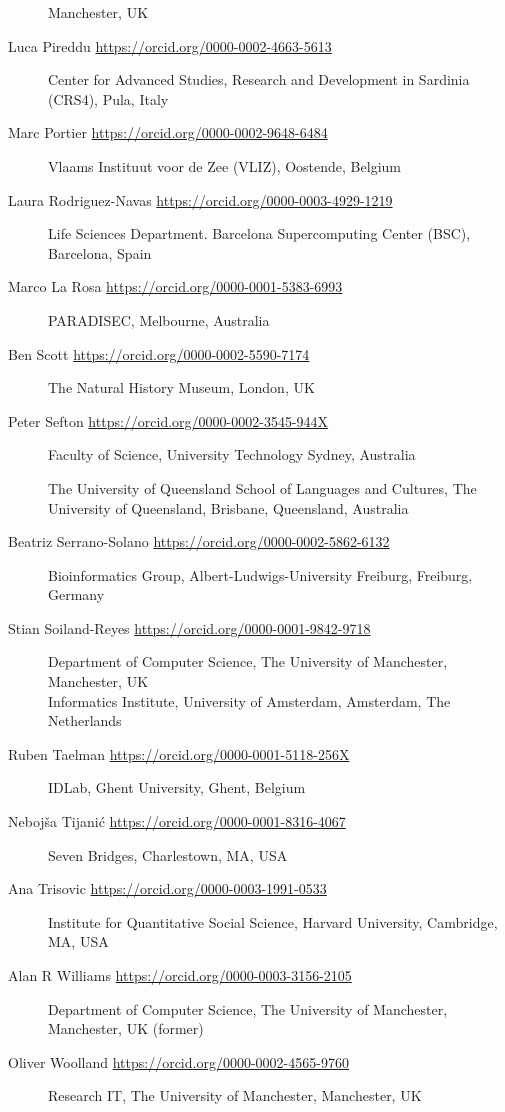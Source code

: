 \begin{description}
Manchester, UK
\item[Luca Pireddu \url{https://orcid.org/0000-0002-4663-5613}]
Center for Advanced Studies, Research and Development in Sardinia
(CRS4), Pula, Italy
\item[Marc Portier \url{https://orcid.org/0000-0002-9648-6484}]
Vlaams Instituut voor de Zee (VLIZ), Oostende, Belgium
\item[Laura Rodriguez-Navas \url{https://orcid.org/0000-0003-4929-1219}]
Life Sciences Department. Barcelona Supercomputing Center (BSC),
Barcelona, Spain
\item[Marco La Rosa \url{https://orcid.org/0000-0001-5383-6993}]
PARADISEC, Melbourne, Australia
\item[Ben Scott \url{https://orcid.org/0000-0002-5590-7174}]
The Natural History Museum, London, UK
\item[Peter Sefton \url{https://orcid.org/0000-0002-3545-944X}]
Faculty of Science, University Technology Sydney, Australia

The University of Queensland School of Languages and Cultures, The
University of Queensland, Brisbane, Queensland, Australia
\item[Beatriz Serrano-Solano
\url{https://orcid.org/0000-0002-5862-6132}]
Bioinformatics Group, Albert-Ludwigs-University Freiburg, Freiburg,
Germany
\item[Stian Soiland-Reyes \url{https://orcid.org/0000-0001-9842-9718}]
Department of Computer Science, The University of Manchester,
Manchester, UK\\
Informatics Institute, University of Amsterdam, Amsterdam, The
Netherlands
\item[Ruben Taelman \url{https://orcid.org/0000-0001-5118-256X}]
IDLab, Ghent University, Ghent, Belgium
\item[Nebojša Tijanić \url{https://orcid.org/0000-0001-8316-4067}]
Seven Bridges, Charlestown, MA, USA
\item[Ana Trisovic \url{https://orcid.org/0000-0003-1991-0533}]
Institute for Quantitative Social Science, Harvard University,
Cambridge, MA, USA
\item[Alan R Williams \url{https://orcid.org/0000-0003-3156-2105}] 
Department of Computer Science, The University of Manchester,
Manchester, UK (former)
\item[Oliver Woolland \url{https://orcid.org/0000-0002-4565-9760}]
Research IT, The University of Manchester, Manchester, UK
\end{description}



